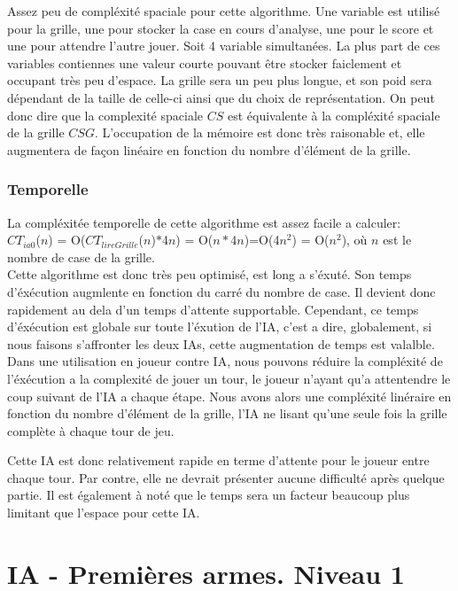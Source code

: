 \documentclass[a4paper,12pt]{report}
\begin{document}
Assez peu de compl\'exit\'e spaciale pour cette algorithme. Une variable est utilis\'e pour la grille, une pour stocker la case en cours d'analyse, une pour le score et une pour attendre l'autre jouer. Soit 4 variable simultan\'ees. La plus part de ces variables contiennes une valeur courte pouvant \^etre stocker faiclement et occupant tr\`es peu d'espace. La grille sera un peu plus longue, et son poid sera d\'ependant de la taille de celle-ci ainsi que du choix de repr\'esentation. On peut donc dire que la complexit\'e spaciale $CS$ est \'equivalente \`a la compl\'exit\'e spaciale de la grille $CSG$. L'occupation de la m\'emoire est donc tr\`es raisonable et, elle augmentera de fa\c{c}on lin\'eaire en fonction du nombre d'\'el\'ement de la grille. 

\subsubsection{Temporelle}

La compl\'exit\'ee temporelle de cette algorithme est assez facile a calculer: \\
$CT_{ia0}$($n$) = O($CT_{lireGrille}$($n$)$*$4$n$) = O($n*$4$n$)=O(4$n^2$) = O($n^2$), o\`u $n$ est le nombre de case de la grille. \\
Cette algorithme est donc tr\`es peu optimis\'e, est long a s'\'exut\'e. Son temps d'\'ex\'ecution augmlente en fonction du carr\'e du nombre de case. Il devient donc rapidement au dela d'un temps d'attente supportable. Cependant, ce temps d'\'ex\'ecution est globale sur toute l'\'exution de l'IA, c'est a dire, globalement, si nous faisons s'affronter les deux IAs, cette augmentation de temps est valalble. Dans une utilisation en joueur contre IA, nous pouvons r\'eduire la compl\'exit\'e de l'\'ex\'ecution a la complexit\'e de jouer un tour, le joueur n'ayant qu'a attentendre le coup suivant de l'IA a chaque \'etape. Nous avons alors une compl\'exit\'e lin\'eraire en fonction du nombre d'\'el\'ement de la grille, l'IA ne lisant qu'une seule fois la grille compl\`ete \`a chaque tour de jeu.

Cette IA est donc relativement rapide en terme d'attente pour le joueur entre chaque tour. Par contre, elle ne devrait pr\'esenter aucune difficult\'e apr\`es quelque partie. Il est \'egalement \`a not\'e que le temps sera un facteur beaucoup plus limitant que l'espace pour cette IA. 

\section{IA - Premi\`eres armes. Niveau 1}
\end{document}
